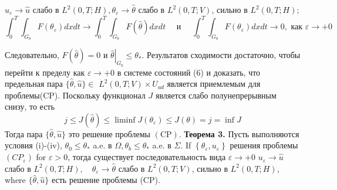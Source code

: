 \documentclass[10pt]{article}
\begin{document}
    $u_{\varepsilon} \rightarrow \widehat{u}$ слабо в
    $L^{2}(0, T ; H), \theta_{\varepsilon} \rightarrow \widehat{\theta}$ слабо в $L^{2}(0, T ; V)$,
    сильно в $L^{2}(0, T ; H)$;
    \[
        \int_{0}^{T} \int_{G_{b}} F\left(\theta_{\varepsilon}\right) d x d t \rightarrow \int_{0}^{T}
        \int_{G_{b}} F(\widehat{\theta}) dx dt \quad \text { и } \quad \int_{0}^{T} \int_{G_{b}}
        F\left(\theta_{\varepsilon}\right) dx dt \rightarrow 0, \text { как } \varepsilon \rightarrow+0
    \]

    Следовательно, $F(\widehat{\theta})=0$ и $\left.\widehat{\theta}\right|_{G_{b}} \leq \theta_{*}$.
    Результатов сходимости достаточно, чтобы перейти к пределу как $\varepsilon \rightarrow+0$
    в системе состояний (6) и доказать, что предельная пара
    $\{\widehat{\theta}, \widehat{u}\} \in$ $L^{2}(0, T ; V) \times U_{a d}$
    является приемлемым для проблемы(CP).
    Поскольку функционал $J$ является слабо полунепрерывным снизу, то есть
    \[
        j \leq J(\widehat{\theta}) \leq \liminf J\left(\theta_{\varepsilon}\right) \leq J(\theta)=j=\inf J
    \]
    Тогда пара $\{\widehat{\theta}, \widehat{u}\}$ это решение проблемы $(\mathrm{CP})$.
    \textbf{Теорема 3.} Пусть выполняются условия (i)-(iv),
    $\theta_{0} \leq \theta_{*}$ a.e. в $\Omega, \theta_{b} \leq \theta_{*}$ a.e. в
    $\Sigma$. If $\left\{\theta_{\varepsilon}, u_{\varepsilon}\right\}$  решения проблемы
    $\left(C P_{\varepsilon}\right)$ for $\varepsilon>0$, тогда существует последовательность вида
    $\varepsilon \rightarrow+0$ $u_{\varepsilon} \rightarrow \widehat{u}$ слабо в
    $L^{2}(0, T ; H), \quad \theta_{\varepsilon} \rightarrow \widehat{\theta}$ слабо в $L^{2}(0, T ; V)$,
    сильно в $L^{2}(0, T ; H)$, where $\{\widehat{\theta}, \widehat{u}\}$ есть решение проблемы (CP).
\end{document}
